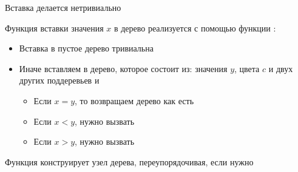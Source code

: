 \begin{frame}{Вставка делается нетривиально}

Функция  вставки значения $x$ в дерево реализуется с помощью функции
:
\begin{itemize}
\item Вставка в пустое дерево тривиальна
\item Иначе вставляем в  дерево, которое состоит из: значения $y$, цвета $c$ и двух других поддеревьев  и 
\begin{itemize}
\item Если $x=y$, то возвращаем дерево как есть
\item Если $x<y$, нужно вызвать 
\item Если $x>y$, нужно вызвать 
\end{itemize}
\end{itemize}
\vspace{2em}
Функция  конструирует узел дерева, переупорядочивая, если нужно
\end{frame}


%
%
%


